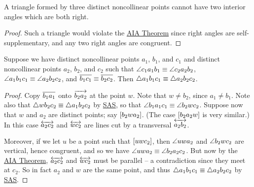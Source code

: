 \begin{cor}
A triangle formed by three distinct noncollinear points cannot have two interior angles which are both right.
\end{cor}

\begin{proof}
Such a triangle would violate the \hyperref[prop:aia-theorem]{AIA Theorem} since right angles are self-supplementary, and any two right angles are congruent.
\end{proof}

\begin{prop}\label{prop:aas-theorem}
Suppose we have distinct noncollinear points \(a_1\), \(b_1\), and \(c_1\) and distinct noncollinear points \(a_2\), \(b_2\), and \(c_2\) such that \(\angle{c_1a_1b_1} \equiv \angle{c_2a_2b_2}\), \(\angle{a_1b_1c_1} \equiv \angle{a_2b_2c_2}\), and \(\overline{b_1c_1} \equiv \overline{b_2c_2}\).
Then \(\bigtriangleup{a_1b_1c_1} \equiv \bigtriangleup{a_2b_2c_2}\).
\end{prop}

\begin{proof}
Copy \(\overline{b_1a_1}\) onto \(\overrightarrow{b_2a_2}\) at the point \(w\).
Note that \(w \neq b_2\), since \(a_1 \neq b_1\).
Note also that \(\bigtriangleup{wb_2c_2} \equiv \bigtriangleup{a_1b_2c_2}\) by \hyperref[prop:sas-theorem]{SAS}, so that \(\angle{b_1a_1c_1} \equiv \angle{b_2wc_2}\).
Suppose now that \(w\) and \(a_2\) are distinct points; say \([ b_2 w a_2 ]\).
(The case \([ b_2 a_2 w ]\) is very similar.)
In this case \(\overleftrightarrow{a_2c_2}\) and \(\overleftrightarrow{wc_2}\) are lines cut by a transversal \(\overleftrightarrow{a_2b_2}\).

\begin{center}
\end{center}

Moreover, if we let \(u\) be a point such that \([ u w c_2 ]\), then \(\angle{uwa_2}\) and \(\angle{b_2wc_2}\) are vertical, hence congruent, and so we have \(\angle{uwa_2} \equiv \angle{b_2a_2c_2}\).
But now by the \hyperref[prop:aia-theorem]{AIA Theorem}, \(\overleftrightarrow{a_2c_2}\) and \(\overleftrightarrow{wc_2}\) must be parallel -- a contradiction since they meet at \(c_2\).
So in fact \(a_2\) and \(w\) are the same point, and thus \(\bigtriangleup{a_1b_1c_1} \equiv \bigtriangleup{a_2b_2c_2}\) by \hyperref[prop:sas-theorem]{SAS}.
\end{proof}

